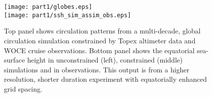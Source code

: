 \begin{figure}
 \begin{center}
   \texttt{[image: part1/globes.eps]}
\\
   \texttt{[image: part1/ssh\_sim\_assim\_obs.eps]}
 \end{center}
\caption{Top panel shows circulation patterns from a
multi-decade, global circulation simulation constrained by Topex altimeter
data and WOCE cruise observations. Bottom panel shows the equatorial
sea-surface height in unconstrained (left), constrained (middle) simulations
and in observations. This output is from a higher resolution, shorter
duration experiment with equatorially enhanced grid spacing.}
\label{fig:hs_zave_u}
\end{figure}
